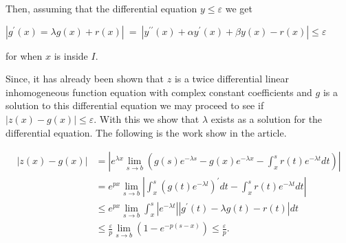\documentclass[mla8]{mla}
\begin{document}
\begin{paper}
Then, assuming that the differential equation $\mathit{y} \leq \varepsilon$ we get
\begin{center}
    $|g^\prime (x)= \lambda g(x) + r(x)|\ =\ |y^{\prime \prime}(x)+\alpha y^{\prime}(x)+\beta y(x)-r(x)| \leq \varepsilon$
\end{center}

for when $x$ is inside $\mathit{I}$.

Since, it has already been shown that $\mathit{z}$ is a twice differential linear inhomogeneous function equation with complex constant coefficients and $\mathit{g}$ is a solution to this differential equation we may proceed to see if $|z(x) - g(x)| \leq \varepsilon$. With this we show that $\lambda$ exists as a solution for the differential equation. The following is the work show in the article.

$$\begin{aligned}
    |z(x)-g(x)| & =\left|e^{\lambda x} \lim _{s \rightarrow b}\left(g(s) e^{-\lambda s}-g(x) e^{-\lambda x}-\int_x^s r(t) e^{-\lambda t} d t\right)\right| \\ & =e^{p x} \lim _{s \rightarrow b}\left|\int_x^s\left(g(t) e^{-\lambda l}\right)^{\prime} d t-\int_x^s r(t) e^{-\lambda t} d t\right| \\ & \leq e^{p x} \lim _{s \rightarrow b} \int_x^s\left|e^{-\lambda t}\right|\left|g^{\prime}(t)-\lambda g(t)-r(t)\right| d t \\ & \leq \frac{\varepsilon}{p} \lim _{s \rightarrow b}\left(1-e^{-p(s-x)}\right) \leq \frac{\varepsilon}{p} .
\end{aligned}$$


\end{paper}
\end{document}
